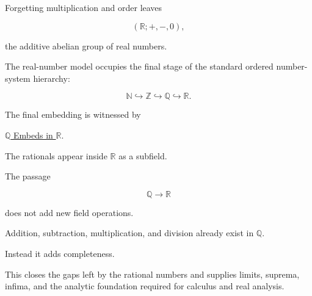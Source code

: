 
\begin{remark*}

Forgetting multiplication and order leaves

\[
(\mathbb R;+,-,0),
\]

the additive abelian group of real numbers.

\end{remark*}


\begin{remark*}

The real-number model occupies the final stage of the standard ordered
number-system hierarchy:

\[
\mathbb N
\hookrightarrow
\mathbb Z
\hookrightarrow
\mathbb Q
\hookrightarrow
\mathbb R.
\]

The final embedding is witnessed by

\hyperref[thm:q-embeds-in-r]
{$\mathbb Q$ Embeds in $\mathbb R$}.

The rationals appear inside $\mathbb R$ as a subfield.

\end{remark*}


\begin{remark*}[Interpretation]

The passage

\[
\mathbb Q
\longrightarrow
\mathbb R
\]

does not add new field operations.

Addition, subtraction, multiplication, and division already exist in
$\mathbb Q$.

Instead it adds completeness.

This closes the gaps left by the rational numbers and supplies limits,
suprema, infima, and the analytic foundation required for calculus and
real analysis.

\end{remark*}


